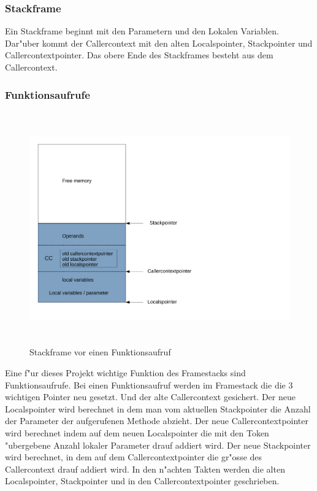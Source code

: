 \subsubsection{Stackframe}
Ein Stackframe beginnt mit den Parametern und den Lokalen Variablen.  Dar"uber kommt der Callercontext mit den alten Localspointer, Stackpointer und Callercontextpointer. Das obere Ende des Stackframes besteht aus dem Callercontext. 

\subsubsection{Funktionsaufrufe}
\begin{figure}
	\centering
	\includegraphics[height = 10cm]{PS_RS_graphics/Stackframe before Invoke.pdf}
	\caption{Stackframe vor einen Funktionsaufruf}
\end{figure}
Eine f"ur dieses Projekt wichtige Funktion des Framestacks sind Funktionsaufrufe. Bei einen Funktionsaufruf werden im Framestack die die 3 wichtigen Pointer neu gesetzt. Und der alte Callercontext gesichert. Der neue Localspointer wird berechnet in dem man vom aktuellen Stackpointer die Anzahl der Parameter der aufgerufenen Methode abzieht. Der neue Callercontextpointer wird berechnet indem auf dem neuen Localspointer die mit den Token "ubergebene Anzahl lokaler Parameter drauf addiert wird. Der neue Stackpointer wird berechnet, in dem auf dem Callercontextpointer die gr"o{ss}e des Callercontext drauf addiert wird. 
In den n"achten Takten werden die alten Localspointer, Stackpointer und in den Callercontextpointer geschrieben. 
